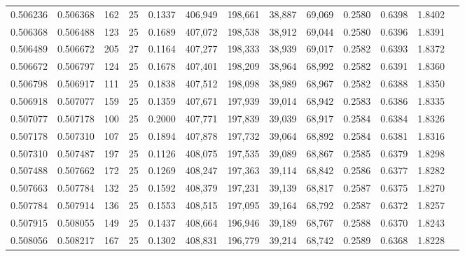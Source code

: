 \begin{tabular}{rrrrrrrrrrrrr}
0.506236 & 0.506368 &   162 &  25 &                                     0.1337 & 406,949 & 198,661 &  38,887 &  69,069 & 0.2580 & 0.6398 & 1.8402 \\
0.506368 & 0.506488 &   123 &  25 &                                     0.1689 & 407,072 & 198,538 &  38,912 &  69,044 & 0.2580 & 0.6396 & 1.8391 \\
0.506489 & 0.506672 &   205 &  27 &                                     0.1164 & 407,277 & 198,333 &  38,939 &  69,017 & 0.2582 & 0.6393 & 1.8372 \\
0.506672 & 0.506797 &   124 &  25 &                                     0.1678 & 407,401 & 198,209 &  38,964 &  68,992 & 0.2582 & 0.6391 & 1.8360 \\
0.506798 & 0.506917 &   111 &  25 &                                     0.1838 & 407,512 & 198,098 &  38,989 &  68,967 & 0.2582 & 0.6388 & 1.8350 \\
0.506918 & 0.507077 &   159 &  25 &                                     0.1359 & 407,671 & 197,939 &  39,014 &  68,942 & 0.2583 & 0.6386 & 1.8335 \\
0.507077 & 0.507178 &   100 &  25 &                                     0.2000 & 407,771 & 197,839 &  39,039 &  68,917 & 0.2584 & 0.6384 & 1.8326 \\
0.507178 & 0.507310 &   107 &  25 &                                     0.1894 & 407,878 & 197,732 &  39,064 &  68,892 & 0.2584 & 0.6381 & 1.8316 \\
0.507310 & 0.507487 &   197 &  25 &                                     0.1126 & 408,075 & 197,535 &  39,089 &  68,867 & 0.2585 & 0.6379 & 1.8298 \\
0.507488 & 0.507662 &   172 &  25 &                                     0.1269 & 408,247 & 197,363 &  39,114 &  68,842 & 0.2586 & 0.6377 & 1.8282 \\
0.507663 & 0.507784 &   132 &  25 &                                     0.1592 & 408,379 & 197,231 &  39,139 &  68,817 & 0.2587 & 0.6375 & 1.8270 \\
0.507784 & 0.507914 &   136 &  25 &                                     0.1553 & 408,515 & 197,095 &  39,164 &  68,792 & 0.2587 & 0.6372 & 1.8257 \\
0.507915 & 0.508055 &   149 &  25 &                                     0.1437 & 408,664 & 196,946 &  39,189 &  68,767 & 0.2588 & 0.6370 & 1.8243 \\
0.508056 & 0.508217 &   167 &  25 &                                     0.1302 & 408,831 & 196,779 &  39,214 &  68,742 & 0.2589 & 0.6368 & 1.8228 \\

\end{tabular}
